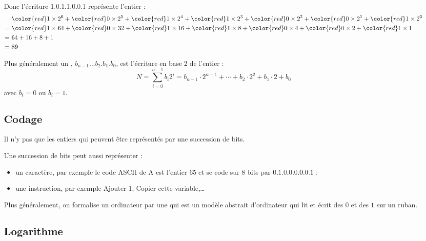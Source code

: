 \documentclass[11pt,class=report,crop=false]{standalone}
\begin{document}
    Donc l'écriture {\color{red}1}.{\color{red}0}.{\color{red}1}.{\color{red}1}.{\color{red}0}.{\color{red}0}.{\color{red}1} représente l'entier : 
    \begin{align*}
    & {\color{red}1} \times 2^6  + {\color{red}0} \times 2^5 + {\color{red}1} \times 2^4  + {\color{red}1} \times 2^3 + {\color{red}0} \times 2^2 + {\color{red}0} \times 2^1 + {\color{red}1} \times 2^0 \\    
    =\ & {\color{red}1} \times 64  + {\color{red}0} \times 32 + {\color{red}1} \times 16  + {\color{red}1} \times 8 + {\color{red}0} \times 4 + {\color{red}0} \times 2 + {\color{red}1} \times 1 \\
    =\ & 64 + 16 + 8 + 1 \\
    =\ & 89
    \end{align*}

Plus généralement un , $b_{n-1}\ldots b_2.b_1.b_0$, est l'écriture en base $2$ de l'entier :
$$N = \sum_{i=0}^{n-1}b_i 2^i = b_{n-1} \cdot 2^{n-1} + \cdots + b_2  \cdot 2^2 + b_1  \cdot 2 + b_0$$
avec $b_i = 0$ ou $b_i=1$.
    
\subsection{Codage}

Il n'y pas que les entiers qui peuvent être représentés par une succession de bits.

Une succession de bits peut aussi représenter :
\begin{itemize}
  \item un caractère, par exemple le code ASCII de \og{}A\fg{} est l'entier $65$ et se code sur $8$ bits par $0.1.0.0.0.0.0.1$ ;
  
  \item une instruction, par exemple \og{}Ajouter 1\fg{}, \og{}Copier cette variable\fg{},\ldots
\end{itemize}

Plus généralement, on formalise un ordinateur par une  qui est un modèle abstrait d'ordinateur qui lit et écrit des $0$ et des $1$ sur un ruban.

\subsection{Logarithme}
\end{document}
